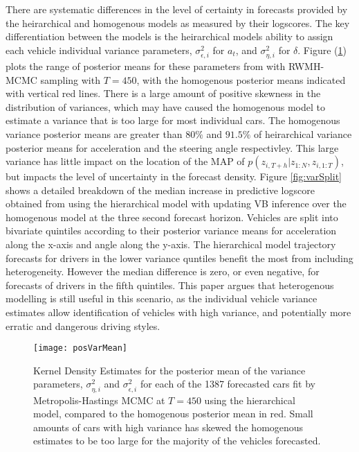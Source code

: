 \documentclass[12pt,a4paper]{article}\usepackage[]{graphicx}\usepackage[]{color}
\begin{document}
There are systematic differences in the level of certainty in forecasts provided by the heirarchical and homogenous models as measured by their logscores. The key differentiation between the models is the heirarchical models ability to assign each vehicle individual variance parameters,  $\sigma^2_{\epsilon, i}$ for $a_t$, and $\sigma^2_{\eta, i}$ for $\delta$. Figure (\ref{fig:posVarMean}) plots the range of posterior means for these parameters from with RWMH-MCMC sampling with $T = 450$, with the homogenous posterior means indicated with vertical red lines. There is a large amount of positive skewness in the distribution of variances, which may have caused the homogenous model to estimate a variance that is too large for most individual cars. The homogenous variance posterior means are greater than $80\%$ and $91.5\%$ of heirarchical variance posterior means for acceleration and the steering angle respectivley. This large variance has little impact on the location of the MAP of $p(z_{i, T+h} | z_{1:N}, z_{i, 1:T})$, but impacts the level of uncertainty in the forecast density. Figure \ref{fig:varSplit} shows a detailed breakdown of the median increase in predictive logscore obtained from using the hierarchical model with updating VB inference over the homogenous model at the three second forecast horizon. Vehicles are split into bivariate quintiles according to their posterior variance means for acceleration along the x-axis and angle along the y-axis. The hierarchical model trajectory forecasts for drivers in the lower variance quntiles benefit the most from including heterogeneity. However the median difference is zero, or even negative, for forecasts of drivers in the fifth quintiles. This paper argues that heterogenous modelling is still useful in this scenario, as the individual vehicle variance estimates allow identification of vehicles with high variance, and potentially more erratic and dangerous driving styles.


\begin{figure}[h]
\centering
\texttt{[image: posVarMean]}
\caption{Kernel Density Estimates for the posterior mean of the variance parameters, $\sigma^2_{\eta, i}$ and $\sigma^2_{\epsilon, i}$ for each of the 1387 forecasted cars fit by Metropolis-Hastings MCMC at $T = 450$ using the hierarchical model, compared to the homogenous posterior mean in red. Small amounts of cars with high variance has skewed the homogenous estimates to be too large for the majority of the vehicles forecasted.}
\label{fig:posVarMean}
\end{figure}
\end{document}
